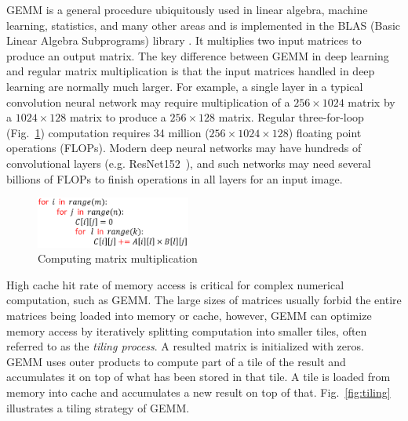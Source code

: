 GEMM is a general procedure ubiquitously used in linear algebra, machine learning, statistics, and many other areas and is implemented in the BLAS (Basic Linear Algebra Subprograms) library \cite{BLAS2002}. It multiplies two input matrices to produce an output matrix. The key difference between GEMM in deep learning and regular matrix multiplication is that the input matrices handled in deep learning are normally much larger. For example, a single layer in a typical convolution neural network may require multiplication of a $256 \times 1024$ matrix by a $1024\times 128$ matrix to produce a $256 \times 128$ matrix. Regular three-for-loop (Fig.~\ref{fig:three}) computation requires 34 million ($256 \times 1024 \times 128$) floating point operations (FLOPs). Modern deep neural networks may have hundreds of convolutional layers (e.g. ResNet152~\cite{He15}), and such networks may need several billions of FLOPs to finish operations in all layers for an input image. 

\begin{figure}[h]
    \centering
    \vspace{-0.1in}
    \includegraphics[width=2in]{3_GEMM_backgrounds/three_for_loop.png}
    \vspace{-0.1in}
    \caption{Computing matrix multiplication}
    \label{fig:three}
\end{figure}

High cache hit rate of memory access is critical for complex numerical computation, such as GEMM. The large sizes of matrices usually forbid the entire matrices being loaded into memory or cache, however, GEMM can optimize memory access by iteratively splitting computation into smaller tiles, often referred to as the \emph{tiling process}.
A resulted matrix is initialized with zeros. GEMM uses outer products to compute part of a tile of the result and accumulates it on top of what has been stored in that tile. A tile is loaded from memory into cache and accumulates a new result on top of that. Fig.~\ref{fig:tiling}~\cite{Matthes17} illustrates a tiling strategy of GEMM.
 
